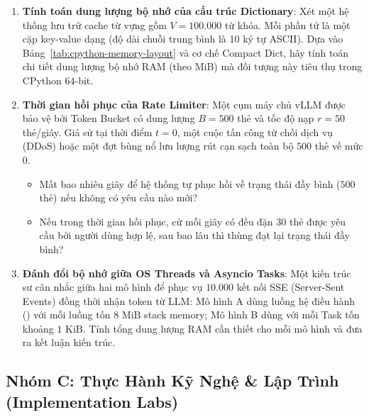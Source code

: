 \begin{enumerate}[label=\textbf{B\arabic*.}]
  \item \textbf{Tính toán dung lượng bộ nhớ của cấu trúc Dictionary}:
  Xét một hệ thống lưu trữ cache từ vựng gồm $V = 100.000$ từ khóa. Mỗi phần tử là một cặp key-value dạng  (độ dài chuỗi trung bình là 10 ký tự ASCII). Dựa vào Bảng~\ref{tab:cpython-memory-layout} và cơ chế Compact Dict, hãy tính toán chi tiết dung lượng bộ nhớ RAM (theo MiB) mà đối tượng  này tiêu thụ trong CPython 64-bit.
  \item \textbf{Thời gian hồi phục của Rate Limiter}:
  Một cụm máy chủ vLLM được bảo vệ bởi Token Bucket có dung lượng $B = 500$ thẻ và tốc độ nạp $r = 50$ thẻ/giây. Giả sử tại thời điểm $t=0$, một cuộc tấn công từ chối dịch vụ (DDoS) hoặc một đợt bùng nổ lưu lượng rút cạn sạch toàn bộ $500$ thẻ về mức $0$.
  \begin{itemize}
    \item[a)] Mất bao nhiêu giây để hệ thống tự phục hồi về trạng thái đầy bình ($500$ thẻ) nếu không có yêu cầu nào mới?
    \item[b)] Nếu trong thời gian hồi phục, cứ mỗi giây có đều đặn $30$ thẻ được yêu cầu bởi người dùng hợp lệ, sau bao lâu thì thùng đạt lại trạng thái đầy bình?
  \end{itemize}
  \item \textbf{Đánh đổi bộ nhớ giữa OS Threads và Asyncio Tasks}:
  Một kiến trúc sư cân nhắc giữa hai mô hình để phục vụ $10.000$ kết nối SSE (Server-Sent Events) đồng thời nhận token từ LLM: Mô hình A dùng luồng hệ điều hành () với mỗi luồng tốn $8\text{ MiB}$ stack memory; Mô hình B dùng  với mỗi Task tốn khoảng $1\text{ KiB}$. Tính tổng dung lượng RAM cần thiết cho mỗi mô hình và đưa ra kết luận kiến trúc.
\end{enumerate}

\subsection{Nhóm C: Thực Hành Kỹ Nghệ \& Lập Trình (Implementation Labs)}

